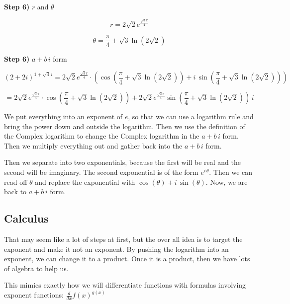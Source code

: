 \documentclass{ximera}
\begin{document}
\begin{procedure}
\textbf{\textcolor{blue!75!black}{Step 6)}}  $r$ and $\theta$ 



\[ r =  2\sqrt{2}  e^{\frac{\sqrt{3}\pi}{4}} \]

\[ \theta =  \frac{\pi}{4} + \sqrt{3} \ln(2\sqrt{2}) \]


\textbf{\textcolor{blue!75!black}{Step 6)}}  $a + b \, i$ form


\[
 (2+2i)^{1+\sqrt{3} \, i}   = 2\sqrt{2}  e^{\frac{\sqrt{3}\pi}{4}} \cdot \left( \cos\left( \frac{\pi}{4} + \sqrt{3} \ln(2\sqrt{2}) \right) + i \, \sin\left( \frac{\pi}{4} + \sqrt{3} \ln(2\sqrt{2}) \right) \right)
\]




\[
   = 2\sqrt{2}  e^{\frac{\sqrt{3}\pi}{4}} \cdot  \cos\left( \frac{\pi}{4} + \sqrt{3} \ln(2\sqrt{2}) \right) + 2\sqrt{2}  e^{\frac{\sqrt{3}\pi}{4}} \sin\left( \frac{\pi}{4} + \sqrt{3} \ln(2\sqrt{2}) \right) \, i
\]

\end{procedure}



We put everything into an exponent of $e$, so that we can use a logarithm rule and bring the power down and outside the logarithm.  Then we use the definition of the Complex logarithm to change the Complex logarithm in the $a + b \, i$ form. Then we multiply everything out and gather back into the $a + b \, i$ form. 

Then we separate into two exponentials, because the first will be real and the second will be imaginary. The second exponential is of the form $e^{i \, \theta}$.  Then we can read off $\theta$ and replace the exponential with $\cos(\theta) + i \, \sin(\theta)$.  Now, we are back to $a + b \, i$ form.




\subsection{Calculus}

That may seem like a lot of steps at first, but the over all idea is to target the exponent and make it not an exponent. By pushing the logarithm into an exponent, we can change it to a product.  Once it is a product, then we have lots of algebra to help us.

This mimics exactly how we will differentiate functions with formulas involving exponent functions:  $\frac{d}{dx} f(x)^{g(x)}$
\end{document}
